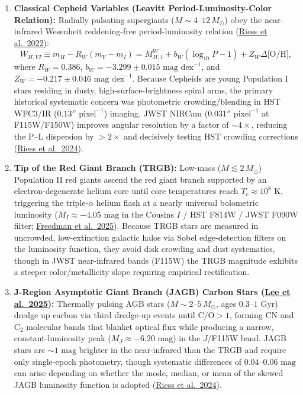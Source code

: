 \documentclass[11pt,letterpaper]{article}
\begin{document}
\begin{enumerate}
    \setlength{\itemsep}{3pt}
    \item \textbf{Classical Cepheid Variables (Leavitt Period-Luminosity-Color Relation):} Radially pulsating supergiants ($M \sim 4\text{--}12\,M_\odot$) obey the near-infrared Wesenheit reddening-free period-luminosity relation (\href{https://arxiv.org/pdf/2112.04510}{Riess et al.\ 2022}):
    \begin{equation}
        W_{H,VI} \equiv m_H - R_W (m_V - m_I) = M_{H,1}^W + b_W (\log_{10} P - 1) + Z_W \Delta\text{[O/H]},
        \label{eq:wesenheit}
    \end{equation}
    where $R_W = 0.386$, $b_W = -3.299 \pm 0.015\text{ mag dex}^{-1}$, and $Z_W = -0.217 \pm 0.046\text{ mag dex}^{-1}$. Because Cepheids are young Population I stars residing in dusty, high-surface-brightness spiral arms, the primary historical systematic concern was photometric crowding/blending in HST WFC3/IR ($0.13''\text{ pixel}^{-1}$) imaging. JWST NIRCam ($0.031''\text{ pixel}^{-1}$ at F115W/F150W) improves angular resolution by a factor of $\sim 4\times$, reducing the P--L dispersion by $>2\times$ and decisively testing HST crowding corrections (\href{https://arxiv.org/abs/2408.11770}{Riess et al.\ 2024}).
    \item \textbf{Tip of the Red Giant Branch (TRGB):} Low-mass ($M \lesssim 2\,M_\odot$) Population II red giants ascend the red giant branch supported by an electron-degenerate helium core until core temperatures reach $T_c \approx 10^8\text{ K}$, triggering the triple-$\alpha$ helium flash at a nearly universal bolometric luminosity ($M_I \approx -4.05\text{ mag}$ in the Cousins $I$ / HST F814W / JWST F090W filter; \href{https://arxiv.org/abs/2408.06153}{Freedman et al.\ 2025}). Because TRGB stars are measured in uncrowded, low-extinction galactic halos via Sobel edge-detection filters on the luminosity function, they avoid disk crowding and dust systematics, though in JWST near-infrared bands (F115W) the TRGB magnitude exhibits a steeper color/metallicity slope requiring empirical rectification.
    \item \textbf{J-Region Asymptotic Giant Branch (JAGB) Carbon Stars (\href{https://arxiv.org/abs/2408.03474}{Lee et al.\ 2025}):} Thermally pulsing AGB stars ($M \sim 2\text{--}5\,M_\odot$, ages $0.3\text{--}1\text{ Gyr}$) dredge up carbon via third dredge-up events until $\text{C/O} > 1$, forming $\text{CN}$ and $\text{C}_2$ molecular bands that blanket optical flux while producing a narrow, constant-luminosity peak ($M_J \approx -6.20\text{ mag}$) in the $J$/F115W band. JAGB stars are $\sim 1\text{ mag}$ brighter in the near-infrared than the TRGB and require only single-epoch photometry, though systematic differences of $0.04\text{--}0.06\text{ mag}$ can arise depending on whether the mode, median, or mean of the skewed JAGB luminosity function is adopted (\href{https://arxiv.org/abs/2408.11770}{Riess et al.\ 2024}).
\end{enumerate}
\end{document}
